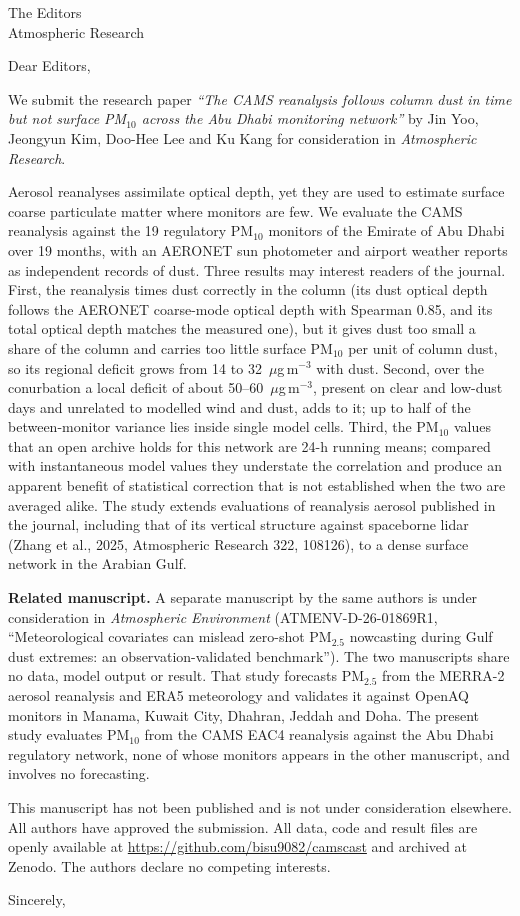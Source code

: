 \documentclass[11pt]{letter}
\begin{document}
\begin{letter}{The Editors\\Atmospheric Research}
\opening{Dear Editors,}

We submit the research paper \emph{``The CAMS reanalysis follows column dust in time but not
surface PM$_{10}$ across the Abu Dhabi monitoring network''} by Jin Yoo, Jeongyun Kim, Doo-Hee Lee
and Ku Kang for consideration in \emph{Atmospheric Research}.

Aerosol reanalyses assimilate optical depth, yet they are used to estimate surface coarse
particulate matter where monitors are few. We evaluate the CAMS reanalysis against the 19
regulatory PM$_{10}$ monitors of the Emirate of Abu Dhabi over 19 months, with an AERONET sun
photometer and airport weather reports as independent records of dust. Three results may interest
readers of the journal. First, the reanalysis times dust correctly in the column (its dust optical
depth follows the AERONET coarse-mode optical depth with Spearman 0.85, and its total optical depth
matches the measured one), but it gives dust too small a share of the column and carries too
little surface PM$_{10}$ per unit of column dust, so its regional deficit grows from 14 to
32~$\mu$g\,m$^{-3}$ with dust. Second, over the conurbation a local deficit of about
50--60~$\mu$g\,m$^{-3}$, present on clear and low-dust days and unrelated to modelled wind and dust,
adds to it; up to half of the between-monitor variance lies inside single model cells. Third, the
PM$_{10}$ values that an open archive holds for this network are 24-h running means; compared with
instantaneous model values they understate the correlation and produce an apparent benefit of
statistical correction that is not established when the two are averaged alike. The study extends
evaluations of reanalysis aerosol published in the journal, including that of its vertical
structure against spaceborne lidar (Zhang et al., 2025, Atmospheric Research 322, 108126), to a
dense surface network in the Arabian Gulf.

\textbf{Related manuscript.} A separate manuscript by the same authors is under consideration in
\emph{Atmospheric Environment} (ATMENV-D-26-01869R1, ``Meteorological covariates can mislead
zero-shot PM$_{2.5}$ nowcasting during Gulf dust extremes: an observation-validated benchmark'').
The two manuscripts share no data, model output or result. That study forecasts PM$_{2.5}$ from
the MERRA-2 aerosol reanalysis and ERA5 meteorology and validates it against OpenAQ monitors in
Manama, Kuwait City, Dhahran, Jeddah and Doha. The present study evaluates PM$_{10}$ from the
CAMS EAC4 reanalysis against the Abu Dhabi regulatory network, none of whose monitors appears in
the other manuscript, and involves no forecasting.

This manuscript has not been published and is not under consideration elsewhere. All authors
have approved the submission. All data, code and result files are openly available at
\url{https://github.com/bisu9082/camscast} and archived at Zenodo. The authors declare no
competing interests.

\closing{Sincerely,}
\end{letter}
\end{document}
